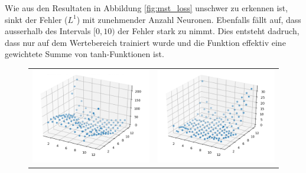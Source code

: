 Wie aus den Resultaten in Abbildung \ref{fig:mst_loss} unschwer zu erkennen ist, sinkt der Fehler ($L^1$) mit zunehmender Anzahl Neuronen. Ebenfalls fällt auf, dass ausserhalb des Intervals $[0, 10)$ der Fehler stark zu nimmt. Dies entsteht dadruch, dass nur auf dem Wertebereich trainiert wurde und die Funktion effektiv eine gewichtete Summe von tanh-Funktionen ist.
\begin{figure}
	\centering
	\begin{tabular}{cc}
		\includegraphics[scale=0.4]{learning/img/abs_plot_2_clean.png} &
		\includegraphics[scale=0.4]{learning/img/abs_plot_6_clean.png} \\

\end{tabular}
\end{figure}
